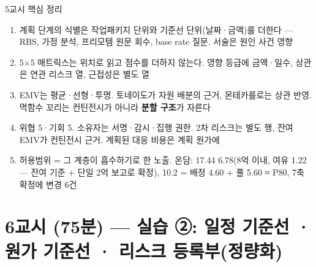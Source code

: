 \begin{frame}{5교시 핵심 정리}
\begin{enumerate}
\item 계획 단계의 식별은 작업패키지 단위와 기준선 단위(날짜·금액)를 더한다 — RBS, 가정 분석, 프리모템 원문 회수, base rate 질문. 서술은 원인 \ra{} 사건 \ra{} 영향
\item 5×5 매트릭스는 위치로 읽고 점수를 더하지 않는다. 영향 등급에 금액·일수, 상관은 연관 리스크 열, 근접성은 별도 열
\item EMV는 평균·선형·투명. 토네이도가 자원 배분의 근거, 몬테카를로는 상관 반영. 멱함수 꼬리는 컨틴전시가 아니라 \textbf{분할 구조}가 자른다
\item 위협 5·기회 5. 소유자는 서명·감시·집행 권한. 2차 리스크는 별도 행, 잔여 EMV가 컨틴전시 근거. 계획된 대응 비용은 계획 원가에
\item 허용범위 = 그 계층이 흡수하기로 한 노출. 온담: 17.44 \ra{} 6.78(8억 이내, 여유 1.22 — 잔여 기준 + 단일 2억 보고로 확정), 10.2 = 배정 4.60 + 풀 5.60 ≈ P80, 7축 확정에 변경 6건
\end{enumerate}
\end{frame}

\section{6교시 (75분) — 실습 ②: 일정 기준선 · 원가 기준선 · 리스크 등록부(정량화)}

